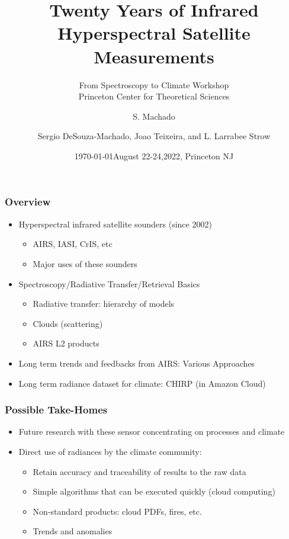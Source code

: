\documentclass[10pt,t]{beamer}
\author{S. Machado}
\date{\today}
\title{\large Twenty Years of Infrared Hyperspectral Satellite Measurements}
\subtitle{\footnotesize{From Spectroscopy to Climate Workshop \\ \vspace{-0.07in} Princeton Center for Theoretical Sciences}}
\date{\vspace{0.1in}\footnotesize{August 22-24,2022, Princeton NJ \vfill}}
\author{Sergio DeSouza-Machado\inst{1}, Joao Teixeira\inst{2}, and L. Larrabee Strow\inst{1}}
\institute{\inst{1}UMBC Physics Department \and \inst{2}NASA Jet Propulsion Laboratory}
\begin{document}
\maketitle
\begin{frame}
  \frametitle{Overview}  
  \begin{itemize}
  \item Hyperspectral infrared satellite sounders (since 2002)
    \begin{itemize}
    \item AIRS, IASI, CrIS, etc
    \item Major uses of these sounders
    \end{itemize}
  \item Spectroscopy/Radiative Transfer/Retrieval Basics
    \begin{itemize}
    \item Radiative transfer: hierarchy of models
    \item Clouds (scattering)
    \item AIRS L2 products
    \end{itemize}
  \end{itemize}
  \begin{itemize}
  \item Long term trends and feedbacks from AIRS: Various Approaches
  \item Long term radiance dataset for climate: CHIRP (in Amazon Cloud)
  \end{itemize}
\end{frame}
\begin{frame}
  \frametitle{Possible Take-Homes}
  \begin{itemize}
  \item Future research with these sensor concentrating on processes and climate
  \item Direct use of radiances by the climate community:
    \begin{itemize}
    \item Retain accuracy and traceability of results to the raw data
    \item Simple algorithms that can be executed quickly (cloud computing)
    \item Non-standard products: cloud PDFs, fires, etc.
    \item Trends and anomalies
    \end{itemize}
  \end{itemize}
\end{frame}
\end{document}
